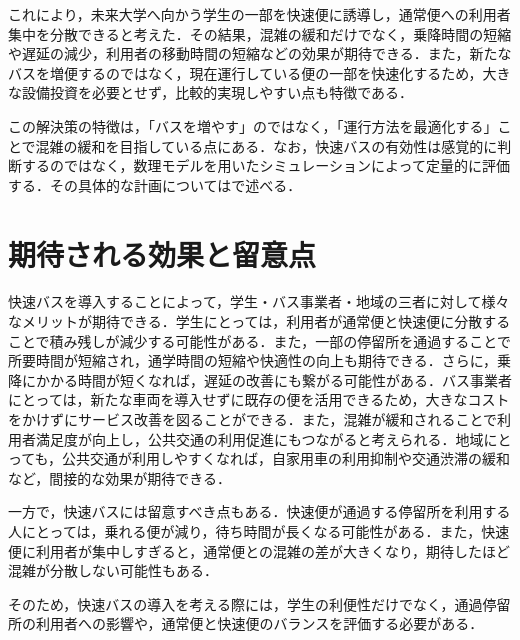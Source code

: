 これにより，未来大学へ向かう学生の一部を快速便に誘導し，通常便への利用者集中を分散できると考えた．その結果，混雑の緩和だけでなく，乗降時間の短縮や遅延の減少，利用者の移動時間の短縮などの効果が期待できる．また，新たなバスを増便するのではなく，現在運行している便の一部を快速化するため，大きな設備投資を必要とせず，比較的実現しやすい点も特徴である．

この解決策の特徴は，「バスを増やす」のではなく，「運行方法を最適化する」ことで混雑の緩和を目指している点にある．なお，快速バスの有効性は感覚的に判断するのではなく，数理モデルを用いたシミュレーションによって定量的に評価する．その具体的な計画についてはで述べる．

\section{期待される効果と留意点}
\enlargethispage{3\baselineskip}%
快速バスを導入することによって，学生・バス事業者・地域の三者に対して様々なメリットが期待できる．学生にとっては，利用者が通常便と快速便に分散することで積み残しが減少する可能性がある．また，一部の停留所を通過することで所要時間が短縮され，通学時間の短縮や快適性の向上も期待できる．さらに，乗降にかかる時間が短くなれば，遅延の改善にも繋がる可能性がある．バス事業者にとっては，新たな車両を導入せずに既存の便を活用できるため，大きなコストをかけずにサービス改善を図ることができる．また，混雑が緩和されることで利用者満足度が向上し，公共交通の利用促進にもつながると考えられる．地域にとっても，公共交通が利用しやすくなれば，自家用車の利用抑制や交通渋滞の緩和など，間接的な効果が期待できる．

一方で，快速バスには留意すべき点もある．快速便が通過する停留所を利用する人にとっては，乗れる便が減り，待ち時間が長くなる可能性がある．また，快速便に利用者が集中しすぎると，通常便との混雑の差が大きくなり，期待したほど混雑が分散しない可能性もある．

そのため，快速バスの導入を考える際には，学生の利便性だけでなく，通過停留所の利用者への影響や，通常便と快速便のバランスを評価する必要がある．
